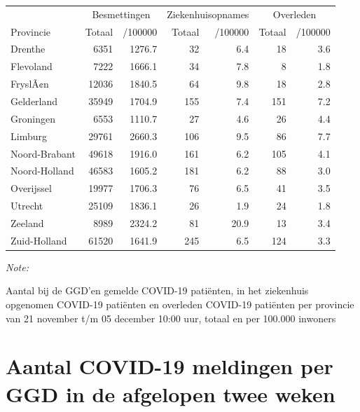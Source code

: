 \documentclass[
  english,
  man,floatsintext]{apa6}
\begin{document}
\begin{table}
\centering
\begin{threeparttable}
\begin{tabular}{lrrrrrr}
\toprule
\multicolumn{1}{c}{ } & \multicolumn{2}{c}{Besmettingen} & \multicolumn{2}{c}{Ziekenhuisopnames} & \multicolumn{2}{c}{Overleden} \\
\cmidrule(l{3pt}r{3pt}){2-3} \cmidrule(l{3pt}r{3pt}){4-5} \cmidrule(l{3pt}r{3pt}){6-7}
Provincie & Totaal & /100000 & Totaal & /100000 & Totaal & /100000\\
\midrule
Drenthe & 6351 & 1276.7 & 32 & 6.4 & 18 & 3.6\\
Flevoland & 7222 & 1666.1 & 34 & 7.8 & 8 & 1.8\\
FryslÃ¢n & 12036 & 1840.5 & 64 & 9.8 & 18 & 2.8\\
Gelderland & 35949 & 1704.9 & 155 & 7.4 & 151 & 7.2\\
Groningen & 6553 & 1110.7 & 27 & 4.6 & 26 & 4.4\\
Limburg & 29761 & 2660.3 & 106 & 9.5 & 86 & 7.7\\
Noord-Brabant & 49618 & 1916.0 & 161 & 6.2 & 105 & 4.1\\
Noord-Holland & 46583 & 1605.2 & 181 & 6.2 & 88 & 3.0\\
Overijssel & 19977 & 1706.3 & 76 & 6.5 & 41 & 3.5\\
Utrecht & 25109 & 1836.1 & 26 & 1.9 & 24 & 1.8\\
Zeeland & 8989 & 2324.2 & 81 & 20.9 & 13 & 3.4\\
Zuid-Holland & 61520 & 1641.9 & 245 & 6.5 & 124 & 3.3\\
\bottomrule
\end{tabular}
\begin{tablenotes}
\item \textit{Note: } 
\item Aantal bij de GGD’en gemelde COVID-19 patiënten, in het ziekenhuis opgenomen COVID-19 patiënten en overleden COVID-19 patiënten per provincie van 21 november t/m 05 december 10:00 uur, totaal en per 100.000 inwoners
\end{tablenotes}
\end{threeparttable}
\end{table}

\newpage

\hypertarget{aantal-covid-19-meldingen-per-ggd-in-de-afgelopen-twee-weken}{%
\section{Aantal COVID-19 meldingen per GGD in de afgelopen twee weken}\label{aantal-covid-19-meldingen-per-ggd-in-de-afgelopen-twee-weken}}
\end{document}
